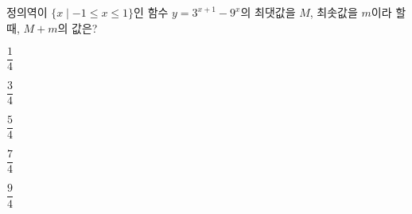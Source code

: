 정의역이 $\{x\mid -1\le x\le 1\}$인 함수 $y=3^{x+1}-9^x$의 최댓값을 $M$, 최솟값을 $m$이라 할 때, $M+m$의 값은?
\begin{choices32}{\rule[-3ex]{0pt}{8ex}$\dfrac{1}{4}$}{\rule[-3ex]{0pt}{8ex}$\dfrac{3}{4}$}{\rule[-3ex]{0pt}{8ex}$\dfrac{5}{4}$}{\rule[-3ex]{0pt}{8ex}$\dfrac{7}{4}$}{\rule[-3ex]{0pt}{8ex}$\dfrac{9}{4}$}\end{choices32}
